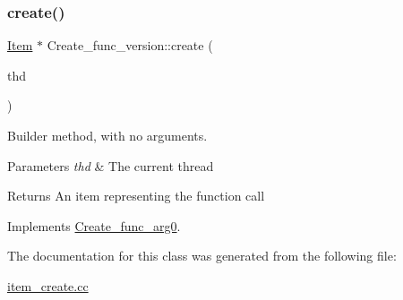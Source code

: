 \subsubsection{\texorpdfstring{create()}{create()}}
{\footnotesize\ttfamily \mbox{\hyperlink{classItem}{Item}} $\ast$ Create\+\_\+func\+\_\+version\+::create (\begin{DoxyParamCaption}\item[{T\+HD $\ast$}]{thd }\end{DoxyParamCaption})\hspace{0.3cm}{\ttfamily [virtual]}}

Builder method, with no arguments. 
\begin{DoxyParams}{Parameters}
{\em thd} & The current thread \\
\hline
\end{DoxyParams}
\begin{DoxyReturn}{Returns}
An item representing the function call 
\end{DoxyReturn}


Implements \mbox{\hyperlink{classCreate__func__arg0_abb65b43817f9382759c79487228ee29f}{Create\+\_\+func\+\_\+arg0}}.



The documentation for this class was generated from the following file\+:\begin{DoxyCompactItemize}
\item 
\mbox{\hyperlink{item__create_8cc}{item\+\_\+create.\+cc}}\end{DoxyCompactItemize}
